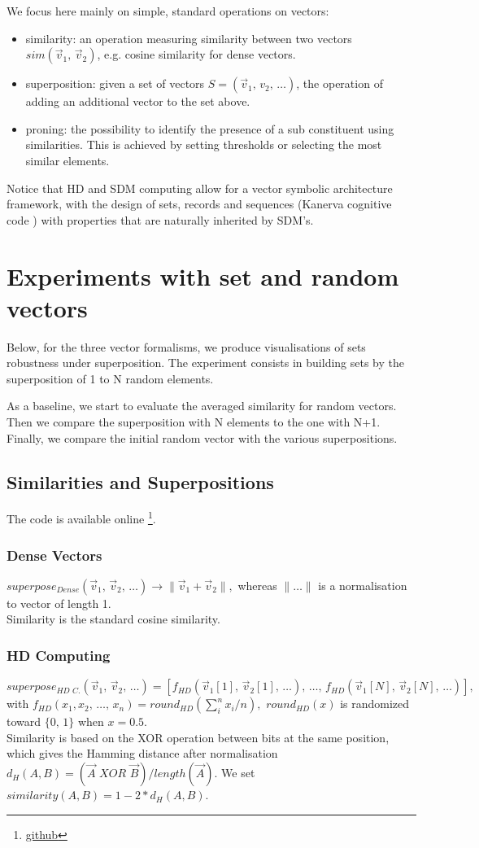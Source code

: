 \documentclass[11pt]{article}
\begin{document}
We focus here mainly on simple, standard operations on vectors:
\begin{itemize}
\item similarity: an operation measuring similarity between two vectors $sim(\vec v_1,\, \vec v_2)$, e.g. cosine similarity for dense vectors.
\item superposition: given a set of vectors $S=(\vec v_1,\, v_2,\, \dots)$, the operation of adding an additional vector to the set above.
\item proning: the possibility to identify the presence of a sub constituent using similarities. This is achieved by setting thresholds or selecting the most similar elements.
\end{itemize}
Notice that HD and SDM computing allow for a vector symbolic architecture framework, with the design of sets, records and sequences (Kanerva cognitive code \cite{kanerva1}) with properties that are naturally inherited by SDM's.






\section{Experiments with set and random vectors}
Below, for the three vector formalisms, we  produce visualisations of sets robustness under superposition.
The experiment consists in building sets by the superposition of 1 to N random elements.

As a baseline, we start to evaluate the averaged similarity for random vectors.  Then we compare the superposition with N elements to the one with N+1. Finally, we compare the initial random vector with the various  superpositions.

\subsection{Similarities and Superpositions}
The code is available online \footnote{\url{github}}.
\subsubsection{Dense Vectors}
	$superpose_{Dense}(\vec v_1,\, \vec v_2, \, \dots) \to \| \vec v_1 + \vec v_2 \|,$
	whereas $\| \dots \|$ is a normalisation to vector of length 1. \\
	Similarity is the standard cosine similarity.
\subsubsection{HD Computing}
	$superpose_{HD\,\, C.}(\vec v_1,\, \vec v_2, \, \dots) = [ f_{HD}(\vec v_1[1], \, \vec v_2[1], \, \dots), \, \dots, \, f_{HD}(\vec v_1[N], \, \vec v_2[N], \, \dots)],$
	with $f_{HD}(x_1, x_2,\, \dots, \, x_n) = round_{HD}(\sum_i^n x_i/ n) ,$
	$round_{HD} (x)$ is randomized toward $\{0, \, 1 \}$ when $x=0.5$.\\
	Similarity is based on the XOR operation between bits at the same position, which gives the Hamming distance after normalisation $d_{H}(A, B) = (\vec A\,\, XOR\,\, \vec B) / length(\vec A)$.
	We set $similarity(A, B) = 1 - 2*d_H(A, B)$.
		
\end{document}

